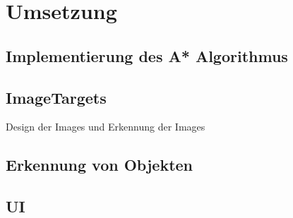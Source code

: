 \chapter{Umsetzung}
\label{sec:Umsetzung}
\section{Implementierung des A* Algorithmus}
\section{ImageTargets}
Design der Images und Erkennung der Images
\section{Erkennung von Objekten}
\section{UI}

